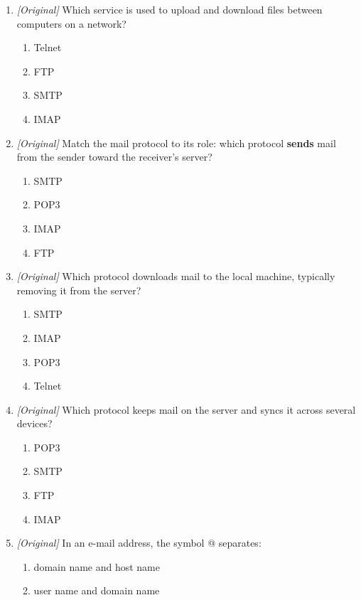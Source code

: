 \begin{enumerate}[label=\textbf{Q\arabic*.}, leftmargin=*]
\begin{enumerate}[label=\Alph*.]
    \item Full Terminal Procedure
    \item Forward Transmission Path
  \end{enumerate}
\item \textit{[Original]} Which service is used to upload and download files
  between computers on a network?
  \begin{enumerate}[label=\Alph*.]
    \item Telnet
    \item FTP
    \item SMTP
    \item IMAP
  \end{enumerate}
\item \textit{[Original]} Match the mail protocol to its role: which protocol
  \textbf{sends} mail from the sender toward the receiver's server?
  \begin{enumerate}[label=\Alph*.]
    \item SMTP
    \item POP3
    \item IMAP
    \item FTP
  \end{enumerate}
\item \textit{[Original]} Which protocol downloads mail to the local machine,
  typically removing it from the server?
  \begin{enumerate}[label=\Alph*.]
    \item SMTP
    \item IMAP
    \item POP3
    \item Telnet
  \end{enumerate}
\item \textit{[Original]} Which protocol keeps mail on the server and syncs
  it across several devices?
  \begin{enumerate}[label=\Alph*.]
    \item POP3
    \item SMTP
    \item FTP
    \item IMAP
  \end{enumerate}
\item \textit{[Original]} In an e-mail address, the symbol @ separates:
  \begin{enumerate}[label=\Alph*.]
    \item domain name and host name
    \item user name and domain name

\end{enumerate}
\end{enumerate}
